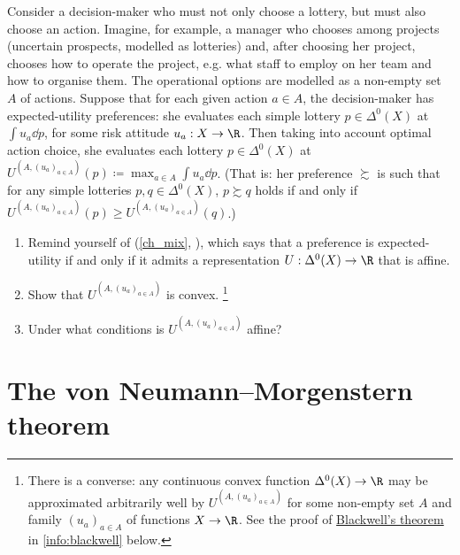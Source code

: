 \begin{exercise}
	\label{exercise:eu_choice}
	Consider a decision-maker who must not only choose a lottery, but must also choose an action. Imagine, for example, a manager who chooses among projects (uncertain prospects, modelled as lotteries) and, after choosing her project, chooses how to operate the project, e.g. what staff to employ on her team and how to organise them. The operational options are modelled as a non-empty set $A$ of actions. Suppose that for each given action $a \in A$, the decision-maker has expected-utility preferences: she evaluates each simple lottery $p \in \Delta^0(X)$ at $\int u_a \dd p$, for some risk attitude $u_a : X \to \R$. Then taking into account optimal action choice, she evaluates each lottery $p \in \Delta^0(X)$ at $U^{(A,(u_a)_{a \in A})}(p) \coloneqq \max_{a \in A} \int u_a \dd p$. (That is: her preference $\succsim$ is such that for any simple lotteries $p,q \in \Delta^0(X)$, $p \succsim q$ holds if and only if $U^{(A,(u_a)_{a \in A})}(p) \geq U^{(A,(u_a)_{a \in A})}(q)$.)

	\begin{enumerate}[label=(\alph*)]
	
		\item Remind yourself of \hyperref[exercise:mix_lottsimple_affine]{} (\cref{ch_mix}, ), which says that a preference is expected-utility if and only if it admits a representation $U : \Delta^0(X) \to \R$ that is affine.

		\item Show that $U^{(A,(u_a)_{a \in A})}$ is convex.%
			\footnote{\label{footnote:convex_max}There is a converse: any continuous convex function $\Delta^0(X) \to \R$ may be approximated arbitrarily well by $U^{(A,(u_a)_{a \in A})}$ for some non-empty set $A$ and family $(u_a)_{a \in A}$ of functions $X \to \R$. See the proof of \hyperref[theorem:blackwell]{Blackwell's theorem} in \cref{info:blackwell} below.}

		\item Under what conditions is $U^{(A,(u_a)_{a \in A})}$ affine?
	
	\end{enumerate}
\end{exercise}



\section{The von Neumann--Morgenstern theorem}
\label{risk:vnm}

